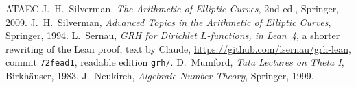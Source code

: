 \documentclass[reqno]{amsart}
\theoremstyle{plain}
\theoremstyle{definition}
\theoremstyle{remark}
\begin{document}
\begin{thebibliography}{ATAEC}
 J.~H.~Silverman, \emph{The Arithmetic of Elliptic Curves}, 2nd ed., Springer, 2009.
 J.~H.~Silverman, \emph{Advanced Topics in the Arithmetic of Elliptic Curves}, Springer, 1994.
 L.~Sernau, \emph{GRH for Dirichlet \(L\)-functions, in Lean~4}, a shorter rewriting of the Lean proof, text by Claude, \url{https://github.com/lsernau/grh-lean}, commit \texttt{72fead1}, readable edition \texttt{grh/}.
 D.~Mumford, \emph{Tata Lectures on Theta I}, Birkh\"auser, 1983.
 J.~Neukirch, \emph{Algebraic Number Theory}, Springer, 1999.
\end{thebibliography}
\end{document}
